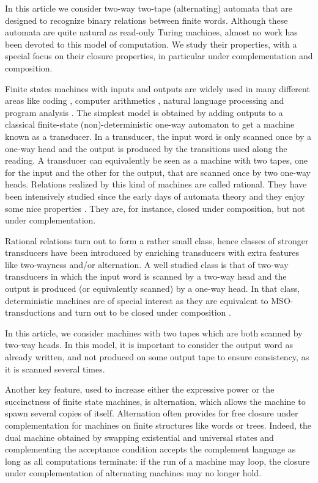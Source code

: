\documentclass[runningheads, envcountsame, a4paper]{llncs}
\begin{document}
In this article we consider two-way two-tape (alternating) automata that
are designed to recognize binary relations between finite words. Although
these automata are quite natural as read-only Turing machines, almost no
work has been devoted to this model of computation.  We study their
properties, with a special focus on their closure properties, in particular
under complementation and composition.

Finite states machines with inputs and outputs are widely used in many
different areas like coding \cite{LindMarcus95}, computer arithmetics
\cite{Frougny02}, natural language processing \cite{RocheSchabes97} and
program analysis \cite{CohenCollard98}.  The simplest model is obtained by
adding outputs to a classical finite-state (non)-deterministic one-way
automaton to get a machine known as a transducer. In a transducer, the
input word is only scanned once by a one-way head and the output is
produced by the transitions used along the reading. A transducer can
equivalently be seen as a machine with two tapes, one for the input and the
other for the output, that are scanned once by two one-way heads.
Relations realized by this kind of machines are called rational.  They have
been intensively studied since the early days of automata theory
\cite{ElgotMezei65} and they enjoy some nice properties
\cite{Sakarovitch09}.  They are, for instance, closed under composition,
but not under complementation.

Rational relations turn out to form a rather small class, hence classes of
stronger transducers have been introduced by enriching transducers with
extra features like two-wayness and/or alternation. A well studied class is
that of two-way transducers in which the input word is scanned by a two-way
head and the output is produced (or equivalently scanned) by a one-way
head.  In that class, deterministic machines are of special interest as
they are equivalent to MSO-transductions and turn out to be closed under
composition \cite{EngelfrietHoogeboom01}.

In this article, we consider machines with two tapes which are both scanned
by two-way heads.  In this model, it is important to consider the output
word as already written, and not produced on some output tape to ensure
consistency, as it is scanned several times.

Another key feature, used to increase either the expressive power or the
succinctness of finite state machines, is alternation, which allows the
machine to spawn several copies of itself.  Alternation often provides for
free closure under complementation for machines on finite structures like
words or trees. Indeed, the dual machine obtained by swapping existential
and universal states and complementing the acceptance condition accepts the
complement language as long as all computations terminate: if the run
of a machine may loop, the closure under complementation of alternating
machines may no longer hold.
\end{document}
